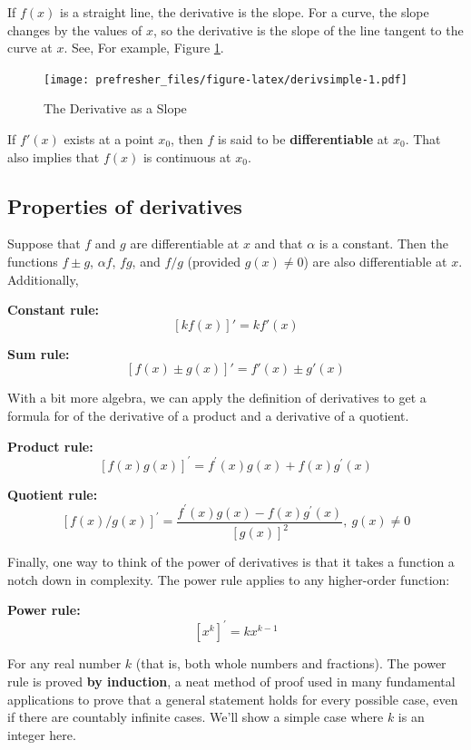 \documentclass[
]{book}
\theoremstyle{definition}
\theoremstyle{definition}
\theoremstyle{definition}
\theoremstyle{remark}
\begin{document}
If \(f(x)\) is a straight line, the derivative is the slope. For a curve, the slope changes by the values of \(x\), so the derivative is the slope of the line tangent to the curve at \(x\). See, For example, Figure \ref{fig:derivsimple}.

\begin{figure}
\centering
\texttt{[image: prefresher\_files/figure-latex/derivsimple-1.pdf]}
\caption{\label{fig:derivsimple}The Derivative as a Slope}
\end{figure}

If \(f'(x)\) exists at a point \(x_0\), then \(f\) is said to be \textbf{differentiable} at \(x_0\). That also implies that \(f(x)\) is continuous at \(x_0\).

\hypertarget{properties-of-derivatives}{%
\subsection*{Properties of derivatives}\label{properties-of-derivatives}}

Suppose that \(f\) and \(g\) are differentiable at \(x\) and that \(\alpha\) is a constant. Then the functions \(f\pm g\), \(\alpha f\), \(f g\), and \(f/g\) (provided \(g(x)\ne 0\)) are also differentiable at \(x\). Additionally,

\textbf{Constant rule:} \[\left[k f(x)\right]' = k f'(x)\]

\textbf{Sum rule:} \[\left[f(x)\pm g(x)\right]' = f'(x)\pm g'(x)\]

With a bit more algebra, we can apply the definition of derivatives to get a formula for of the derivative of a product and a derivative of a quotient.

\textbf{Product rule:} \[\left[f(x)g(x)\right]^\prime = f^\prime(x)g(x)+f(x)g^\prime(x)\]

\textbf{Quotient rule:} \[\left[f(x)/g(x)\right]^\prime = \frac{f^\prime(x)g(x) - f(x)g^\prime(x)}{[g(x)]^2}, ~g(x)\neq 0\]

Finally, one way to think of the power of derivatives is that it takes a function a notch down in complexity. The power rule applies to any higher-order function:

\textbf{Power rule:} \[\left[x^k\right]^\prime = k x^{k-1}\]

For any real number \(k\) (that is, both whole numbers and fractions). The power rule is proved \textbf{by induction}, a neat method of proof used in many fundamental applications to prove that a general statement holds for every possible case, even if there are countably infinite cases. We'll show a simple case where \(k\) is an integer here.
\end{document}
